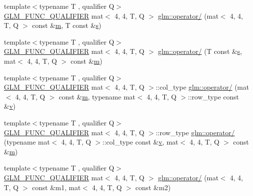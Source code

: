 \begin{DoxyCompactItemize}
\item 
{\footnotesize template$<$typename T , qualifier Q$>$ }\\\mbox{\hyperlink{setup_8hpp_a33fdea6f91c5f834105f7415e2a64407}{G\+L\+M\+\_\+\+F\+U\+N\+C\+\_\+\+Q\+U\+A\+L\+I\+F\+I\+ER}} mat$<$ 4, 4, T, Q $>$ \mbox{\hyperlink{namespaceglm_af9a49fff03e1135c8a4e7736ef113e9e}{glm\+::operator/}} (mat$<$ 4, 4, T, Q $>$ const \&\mbox{\hyperlink{_s_d_l__opengl__glext_8h_af593500c283bf1a787a6f947f503a5c2}{m}}, T const \&\mbox{\hyperlink{_s_d_l__opengl_8h_a4af680a6c683f88ed67b76f207f2e6e4}{s}})
\item 
{\footnotesize template$<$typename T , qualifier Q$>$ }\\\mbox{\hyperlink{setup_8hpp_a33fdea6f91c5f834105f7415e2a64407}{G\+L\+M\+\_\+\+F\+U\+N\+C\+\_\+\+Q\+U\+A\+L\+I\+F\+I\+ER}} mat$<$ 4, 4, T, Q $>$ \mbox{\hyperlink{namespaceglm_a584714fe13d716d288b5825f55cb9bc4}{glm\+::operator/}} (T const \&\mbox{\hyperlink{_s_d_l__opengl_8h_a4af680a6c683f88ed67b76f207f2e6e4}{s}}, mat$<$ 4, 4, T, Q $>$ const \&\mbox{\hyperlink{_s_d_l__opengl__glext_8h_af593500c283bf1a787a6f947f503a5c2}{m}})
\item 
{\footnotesize template$<$typename T , qualifier Q$>$ }\\\mbox{\hyperlink{setup_8hpp_a33fdea6f91c5f834105f7415e2a64407}{G\+L\+M\+\_\+\+F\+U\+N\+C\+\_\+\+Q\+U\+A\+L\+I\+F\+I\+ER}} mat$<$ 4, 4, T, Q $>$\+::col\+\_\+type \mbox{\hyperlink{namespaceglm_add94ecd5b862f66e257ddbbf0baf75d2}{glm\+::operator/}} (mat$<$ 4, 4, T, Q $>$ const \&\mbox{\hyperlink{_s_d_l__opengl__glext_8h_af593500c283bf1a787a6f947f503a5c2}{m}}, typename mat$<$ 4, 4, T, Q $>$\+::row\+\_\+type const \&\mbox{\hyperlink{_s_d_l__opengl_8h_a10a82eabcb59d2fcd74acee063775f90}{v}})
\item 
{\footnotesize template$<$typename T , qualifier Q$>$ }\\\mbox{\hyperlink{setup_8hpp_a33fdea6f91c5f834105f7415e2a64407}{G\+L\+M\+\_\+\+F\+U\+N\+C\+\_\+\+Q\+U\+A\+L\+I\+F\+I\+ER}} mat$<$ 4, 4, T, Q $>$\+::row\+\_\+type \mbox{\hyperlink{namespaceglm_ac06cdd1820160ae6b8e9f720b002df59}{glm\+::operator/}} (typename mat$<$ 4, 4, T, Q $>$\+::col\+\_\+type const \&\mbox{\hyperlink{_s_d_l__opengl_8h_a10a82eabcb59d2fcd74acee063775f90}{v}}, mat$<$ 4, 4, T, Q $>$ const \&\mbox{\hyperlink{_s_d_l__opengl__glext_8h_af593500c283bf1a787a6f947f503a5c2}{m}})
\item 
{\footnotesize template$<$typename T , qualifier Q$>$ }\\\mbox{\hyperlink{setup_8hpp_a33fdea6f91c5f834105f7415e2a64407}{G\+L\+M\+\_\+\+F\+U\+N\+C\+\_\+\+Q\+U\+A\+L\+I\+F\+I\+ER}} mat$<$ 4, 4, T, Q $>$ \mbox{\hyperlink{namespaceglm_acc629aef32528a5a54e77fb86460dbee}{glm\+::operator/}} (mat$<$ 4, 4, T, Q $>$ const \&m1, mat$<$ 4, 4, T, Q $>$ const \&m2)

\end{DoxyCompactItemize}
